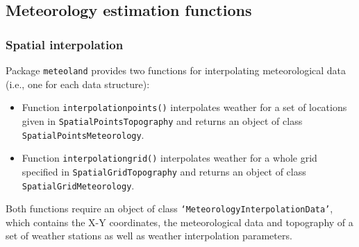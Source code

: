 \documentclass[11pt,a4paper]{article}
\begin{document}
\subsection{Meteorology estimation functions}
\subsubsection{Spatial interpolation}
Package \texttt{meteoland} provides two functions for interpolating meteorological data (i.e., one for each data structure):
\begin{itemize}
\item{Function \texttt{interpolationpoints()} interpolates weather for a set of locations given in \texttt{SpatialPointsTopography} and returns an object of class \texttt{SpatialPointsMeteorology}.}
\item{Function \texttt{interpolationgrid()} interpolates weather for a whole grid specified in \texttt{SpatialGridTopography} and returns an object of class \texttt{SpatialGridMeteorology}.}
\end{itemize}
Both functions require an object of class \texttt{`MeteorologyInterpolationData'}, which contains the X-Y coordinates, the meteorological data and topography of a set of weather stations as well as weather interpolation parameters.
\end{document}
